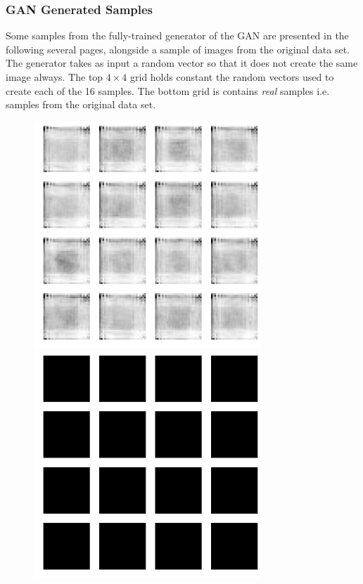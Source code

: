 \documentclass{article}
\renewcommand{\it}{\textit}
\begin{document}
\subsubsection{GAN Generated Samples}

Some samples from the fully-trained generator of the GAN are presented in the following several pages, alongside a sample of images from the original data set.
The generator takes as input a random vector so that it does not create the same image always.
The top $4 \times 4$ grid holds constant the random vectors used to create each of the 16 samples.
The bottom grid is contains \it{real} samples i.e. samples from the original data set.


\clearpage
{}
\thispagestyle{empty}
\begin{figure}[ht]
\label{fig:gan-samples-solidcolor}
\centering
\includegraphics[height=323px]{gan-sample-fake-solidcolor.png}
\caption{}
\vspace{1em}
\includegraphics[height=323px]{gan-sample-real-solidcolor.png}
\end{figure}
\end{document}

